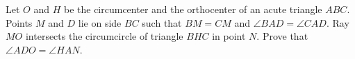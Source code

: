 Let $O$ and $H$ be the circumcenter and the orthocenter of an acute triangle $ABC$. Points $M$ and $D$ lie on side $BC$ such that $BM=CM$ and $\angle BAD = \angle CAD$. Ray $MO$ intersects the circumcircle of triangle $BHC$ in point $N$. Prove that $\angle ADO = \angle HAN$.